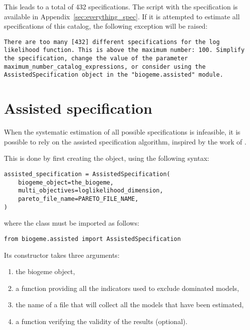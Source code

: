 \documentclass[12pt,a4paper]{article}
\begin{document}
This leads to a total of 432 specifications. The script with the specification is available in
Appendix~\ref{sec:everything_spec}. If it is attempted to estimate all specifications of this catalog, the following exception will be raised:
\begin{lstlisting}
There are too many [432] different specifications for the log likelihood function. This is above the maximum number: 100. Simplify the specification, change the value of the parameter maximum_number_catalog_expressions, or consider using the AssistedSpecification object in the "biogeme.assisted" module.
\end{lstlisting}

\section{Assisted specification}

When the systematic estimation of all possible specifications is
infeasible, it is possible to rely on the assisted specification
algorithm, inspired by the work of
.

This is done by first creating the object, using the following syntax:
\begin{lstlisting}
assisted_specification = AssistedSpecification(
    biogeme_object=the_biogeme,
    multi_objectives=loglikelihood_dimension,
    pareto_file_name=PARETO_FILE_NAME,
)
\end{lstlisting}
where the class \lstinline@AssistedSpecification@ must be imported  as follows:
\begin{lstlisting}
from biogeme.assisted import AssistedSpecification
\end{lstlisting}
Its constructor takes three arguments:
\begin{enumerate}
\item the biogeme object,
\item a function providing all the indicators used to exclude dominated models,
\item the name of a file that will collect all the models that have been estimated,
\item a function verifying the validity of the results (optional).
\end{enumerate}
\end{document}
